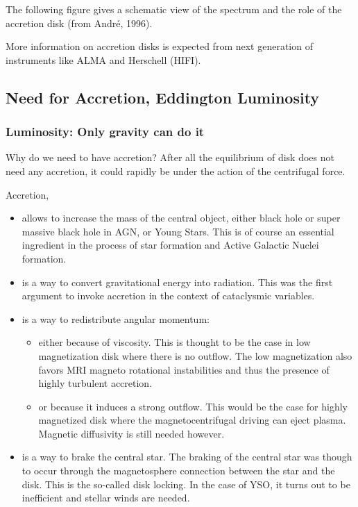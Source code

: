 \documentclass[10pt,a4paper,english]{article}
\begin{document}
The following figure gives a schematic view of the spectrum and the role of the
accretion disk (from André, 1996).


More information on accretion disks is expected from next generation of
instruments like ALMA and Herschell (HIFI).

\subsection{Need for Accretion, Eddington Luminosity}

\subsubsection{Luminosity: Only gravity can do it}

Why do we need to have accretion? After all the equilibrium of disk does not
need any accretion, it could rapidly be under the action of the centrifugal
force.

Accretion,
\begin{itemize}
    \item allows to increase the mass of the central object, either black hole
          or super massive black hole in AGN, or Young Stars. This is of course
          an essential ingredient in the process of star formation and Active
          Galactic Nuclei formation.
    \item is a way to convert gravitational energy into radiation. This was the
          first argument to invoke accretion in the context of cataclysmic
          variables.
    \item is a way to redistribute angular momentum:
          \begin{itemize}
              \item either because of viscosity. This is thought to be the case
                    in low magnetization disk where there is no outflow. The
                    low magnetization also favors MRI magneto rotational
                    instabilities and thus the presence of highly turbulent
                    accretion.
              \item or because it induces a strong outflow. This would be the
                    case for highly magnetized disk where the
                    magnetocentrifugal driving can eject plasma. Magnetic
                    diffusivity is still needed however.
          \end{itemize}
    \item is a way to brake the central star. The braking of the central star
          was though to occur through the magnetosphere connection between the
          star and the disk. This is the so-called disk locking. In the case of
          YSO, it turns out to be inefficient and stellar winds are needed.
\end{itemize}
\end{document}
